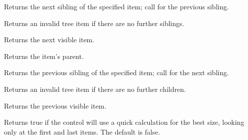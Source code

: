 \label{wxtreectrlgetnextsibling}


Returns the next sibling of the specified item; call  for the previous sibling.

Returns an invalid tree item if there are no further siblings.




\label{wxtreectrlgetnextvisible}


Returns the next visible item.


\label{wxtreectrlgetitemparent}


Returns the item's parent.


\label{wxtreectrlgetprevsibling}


Returns the previous sibling of the specified item; call  for the next sibling.

Returns an invalid tree item if there are no further children.




\label{wxtreectrlgetprevvisible}


Returns the previous visible item.


\label{wxtreectrlgetquickbestsize}


Returns true if the control will use a quick calculation for the best size,
looking only at the first and last items. The default is false.

